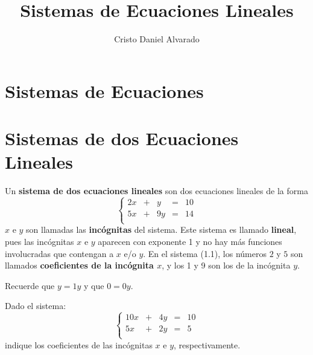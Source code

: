 \documentclass[12pt]{report}
\theoremstyle{largebreak}
\begin{document}
    \setlength{\parskip}{5pt} %
    \setlength{\parindent}{12pt} %
    \title{Sistemas de Ecuaciones Lineales}
    \author{Cristo Daniel Alvarado}
    \maketitle

    
    \setcounter{chapter}{1}
    
    \section{Sistemas de Ecuaciones}

    \section{Sistemas de dos Ecuaciones Lineales}

    Un \textbf{sistema de dos ecuaciones lineales} son dos ecuaciones lineales de la forma
    \begin{equation}
        \left\{
            \begin{array}{ccccc}
                2x & + & y & = & 10 \\
                5x & + & 9y & = & 14 \\
            \end{array}
        \right.
    \end{equation}
    $x$ e $y$ son llamadas las \textbf{incógnitas} del sistema. Este sistema es llamado \textbf{lineal}, pues las incógnitas $x$ e $y$ aparecen con exponente 1 y no hay más funciones involucradas que contengan a $x$ e/o $y$. En el sistema (1.1), los números $2$ y $5$ son llamados \textbf{coeficientes de la incógnita $x$}, y los 1 y 9 son los de la incógnita $y$.

    \begin{obs}
        Recuerde que $y=1y$ y que $0=0y$.
    \end{obs}

    \begin{excer}
        Dado el sistema:
        \begin{equation*}
            \left\{
                \begin{array}{ccccc}
                    10x & + & 4y & = & 10 \\
                    5x & + & 2y & = & 5 \\
                \end{array}
            \right.
        \end{equation*}
        indique los coeficientes de las incógnitas $x$ e $y$, respectivamente.
    \end{excer}
\end{document}
